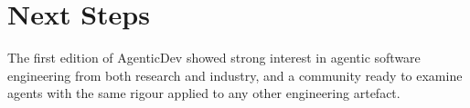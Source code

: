 \section{Next Steps}
\label{sec:next}

The first edition of AgenticDev showed strong interest in agentic software engineering from both research and industry, and a community ready to examine agents with the same rigour applied to any other engineering artefact. 
